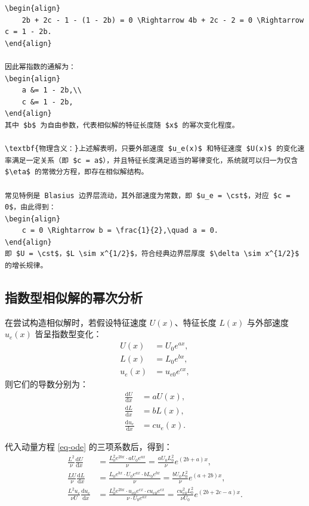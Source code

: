 {\begin{verbatim}
\begin{align}
    2b + 2c - 1 - (1 - 2b) = 0 \Rightarrow 4b + 2c - 2 = 0 \Rightarrow c = 1 - 2b.
\end{align}

因此幂指数的通解为：
\begin{align}
    a &= 1 - 2b,\\
    c &= 1 - 2b,
\end{align}
其中 $b$ 为自由参数，代表相似解的特征长度随 $x$ 的幂次变化程度。

\textbf{物理含义：}上述解表明，只要外部速度 $u_e(x)$ 和特征速度 $U(x)$ 的变化速率满足一定关系（即 $c = a$），并且特征长度满足适当的幂律变化，系统就可以归一为仅含 $\eta$ 的常微分方程，即存在相似解结构。

常见特例是 Blasius 边界层流动，其外部速度为常数，即 $u_e = \cst$，对应 $c = 0$，由此得到：
\begin{align}
    c = 0 \Rightarrow b = \frac{1}{2},\quad a = 0.
\end{align}
即 $U = \cst$，$L \sim x^{1/2}$，符合经典边界层厚度 $\delta \sim x^{1/2}$ 的增长规律。
\end{verbatim}
}

\subsection*{指数型相似解的幂次分析}

在尝试构造相似解时，若假设特征速度 $U(x)$、特征长度 $L(x)$ 与外部速度 $u_e(x)$ 皆呈指数型变化：
\begin{align}
    U(x) &= U_0 e^{a x},\\
    L(x) &= L_0 e^{b x},\\
    u_e(x) &= u_{e0} e^{c x},
\end{align}
则它们的导数分别为：
\begin{align}
    \frac{\mathrm{d}U}{\mathrm{d}x} &= a U(x),\\
    \frac{\mathrm{d}L}{\mathrm{d}x} &= b L(x),\\
    \frac{\mathrm{d}u_e}{\mathrm{d}x} &= c u_e(x).
\end{align}

代入动量方程 \eqref{eq-ode} 的三项系数后，得到：
\begin{align}
    \frac{L^2}{\nu} \frac{\mathrm{d}U}{\mathrm{d}x} &= \frac{L_0^2 e^{2bx} \cdot a U_0 e^{a x}}{\nu}
    = \frac{a U_0 L_0^2}{\nu} e^{(2b + a)x},\\
    \frac{LU}{\nu} \frac{\mathrm{d}L}{\mathrm{d}x} &= \frac{L_0 e^{bx} \cdot U_0 e^{a x} \cdot b L_0 e^{bx}}{\nu}
    = \frac{b U_0 L_0^2}{\nu} e^{(a + 2b)x},\\
    \frac{L^2 u_e}{\nu U} \frac{\mathrm{d}u_e}{\mathrm{d}x}
    &= \frac{L_0^2 e^{2bx} \cdot u_{e0} e^{cx} \cdot c u_{e0} e^{cx}}{\nu \cdot U_0 e^{a x}}
    = \frac{c u_{e0}^2 L_0^2}{\nu U_0} e^{(2b + 2c - a)x}.
\end{align}

